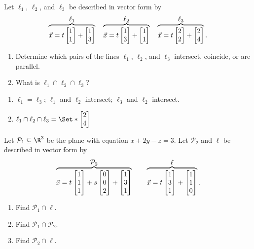 \begin{exercises}
\begin{problist}
\begin{solution}
\begin{enumerate}
    		\end{enumerate}
		\end{solution}
		\prob Let $\ell_1$, $\ell_2$, and $\ell_3$ be described in vector form by
		\[
			\overbrace{\vec x=t\mat{1\\1}+\mat{1\\3}}^{\displaystyle \ell_1}
			\quad
			\overbrace{\vec x=t\mat{1\\3}+\mat{1\\1}}^{\displaystyle \ell_2}
			\quad
			\overbrace{\vec x=t\mat{2\\2}+\mat{2\\4}}^{\displaystyle \ell_3}.
		\]
		\begin{enumerate}
			\item
				Determine which pairs of the lines $\ell_1$, $\ell_2$, and $\ell_3$ intersect, 
				coincide, or are parallel.
			\item What is $\ell_1\cap\ell_2\cap\ell_3$?
		\end{enumerate}
		\begin{solution} 
		    \begin{enumerate}
		        \item $\ell_1 = \ell_3$; $\ell_1$ and $\ell_2$ intersect; $\ell_3$ and $\ell_2$ intersect.
		        \item $\ell_1\cap\ell_2\cap\ell_3 = \Set*{\mat{2\\4}}$
		    \end{enumerate}
		\end{solution}
		\prob Let $\mathcal P_1\subseteq\R^3$ be the plane with equation $x+2y-z=3$. Let
		$\mathcal P_2$ and $\ell$ be described in vector form by
		\[
			\overbrace{\vec x=t\mat{1\\1\\1}+s\mat{0\\0\\2}+\mat{1\\3\\1}}^{\displaystyle \mathcal P_2}
			\qquad
			\overbrace{\vec x=t\mat{1\\3\\1}+\mat{1\\1\\0}}^{\displaystyle \ell}.
		\]
		\begin{enumerate}
			\item Find $\mathcal P_1\cap \ell$.
			\item Find $\mathcal P_1\cap \mathcal P_2$.
			\item Find $\mathcal P_2\cap \ell$.

\end{enumerate}
\end{problist}
\end{exercises}
